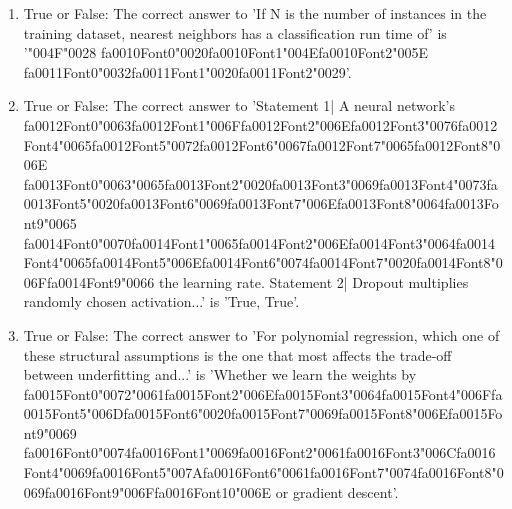 \documentclass[12pt]{article}
\begin{document}
\begin{enumerate}[label=\arabic*.]
\item True or False: The correct answer to 'If N is the number of instances in the training dataset, nearest neighbors has a classification run time of' is '{\char"004F}{\char"0028} {\csname fa0010Font0\endcsname\char"0020}{\csname fa0010Font1\endcsname\char"004E}{\csname fa0010Font2\endcsname\char"005E} {\csname fa0011Font0\endcsname\char"0032}{\csname fa0011Font1\endcsname\char"0020}{\csname fa0011Font2\endcsname\char"0029}'.
\item True or False: The correct answer to 'Statement 1| A neural network's {\csname fa0012Font0\endcsname\char"0063}{\csname fa0012Font1\endcsname\char"006F}{\csname fa0012Font2\endcsname\char"006E}{\csname fa0012Font3\endcsname\char"0076}{\csname fa0012Font4\endcsname\char"0065}{\csname fa0012Font5\endcsname\char"0072}{\csname fa0012Font6\endcsname\char"0067}{\csname fa0012Font7\endcsname\char"0065}{\csname fa0012Font8\endcsname\char"006E} {\csname fa0013Font0\endcsname\char"0063}{\char"0065}{\csname fa0013Font2\endcsname\char"0020}{\csname fa0013Font3\endcsname\char"0069}{\csname fa0013Font4\endcsname\char"0073}{\csname fa0013Font5\endcsname\char"0020}{\csname fa0013Font6\endcsname\char"0069}{\csname fa0013Font7\endcsname\char"006E}{\csname fa0013Font8\endcsname\char"0064}{\csname fa0013Font9\endcsname\char"0065} {\csname fa0014Font0\endcsname\char"0070}{\csname fa0014Font1\endcsname\char"0065}{\csname fa0014Font2\endcsname\char"006E}{\csname fa0014Font3\endcsname\char"0064}{\csname fa0014Font4\endcsname\char"0065}{\csname fa0014Font5\endcsname\char"006E}{\csname fa0014Font6\endcsname\char"0074}{\csname fa0014Font7\endcsname\char"0020}{\csname fa0014Font8\endcsname\char"006F}{\csname fa0014Font9\endcsname\char"0066} the learning rate. Statement 2| Dropout multiplies randomly chosen activation...' is 'True, True'.
\item True or False: The correct answer to 'For polynomial regression, which one of these structural assumptions is the one that most affects the trade-off between underfitting and...' is 'Whether we learn the weights by {\csname fa0015Font0\endcsname\char"0072}{\char"0061}{\csname fa0015Font2\endcsname\char"006E}{\csname fa0015Font3\endcsname\char"0064}{\csname fa0015Font4\endcsname\char"006F}{\csname fa0015Font5\endcsname\char"006D}{\csname fa0015Font6\endcsname\char"0020}{\csname fa0015Font7\endcsname\char"0069}{\csname fa0015Font8\endcsname\char"006E}{\csname fa0015Font9\endcsname\char"0069} {\csname fa0016Font0\endcsname\char"0074}{\csname fa0016Font1\endcsname\char"0069}{\csname fa0016Font2\endcsname\char"0061}{\csname fa0016Font3\endcsname\char"006C}{\csname fa0016Font4\endcsname\char"0069}{\csname fa0016Font5\endcsname\char"007A}{\csname fa0016Font6\endcsname\char"0061}{\csname fa0016Font7\endcsname\char"0074}{\csname fa0016Font8\endcsname\char"0069}{\csname fa0016Font9\endcsname\char"006F}{\csname fa0016Font10\endcsname\char"006E} or gradient descent'.

\end{enumerate}
\end{document}
